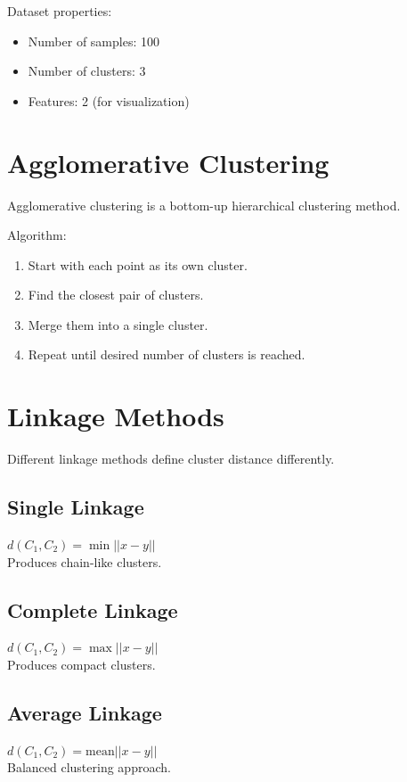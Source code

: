 \documentclass[12pt,a4paper]{article}
\begin{document}
Dataset properties:

\begin{itemize}
\item Number of samples: 100
\item Number of clusters: 3
\item Features: 2 (for visualization)
\end{itemize}


\section{Agglomerative Clustering}

Agglomerative clustering is a bottom-up hierarchical clustering method.

Algorithm:

\begin{enumerate}
\item Start with each point as its own cluster.
\item Find the closest pair of clusters.
\item Merge them into a single cluster.
\item Repeat until desired number of clusters is reached.
\end{enumerate}


\section{Linkage Methods}

Different linkage methods define cluster distance differently.

\subsection{Single Linkage}
$d(C_1, C_2) = \min ||x - y||$ \\
Produces chain-like clusters.

\subsection{Complete Linkage}
$d(C_1, C_2) = \max ||x - y||$ \\
Produces compact clusters.

\subsection{Average Linkage}
$d(C_1, C_2) = \text{mean} ||x - y||$ \\
Balanced clustering approach.
\end{document}
